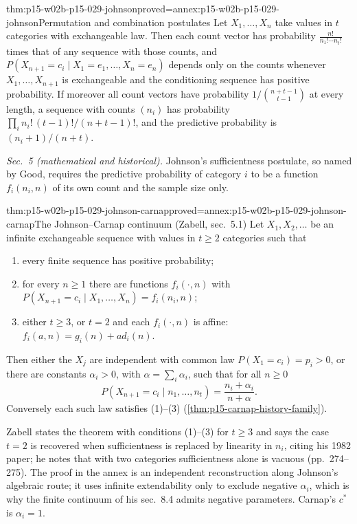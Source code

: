 \begin{hbtheorem}{thm:p15-w02b-p15-029-johnson}{proved=annex:p15-w02b-p15-029-johnson}{Permutation and combination postulates}
Let \(X_1,\ldots,X_n\) take values in \(t\) categories with
exchangeable law. Then each count vector has probability
\(\frac{n!}{n_1!\cdots n_t!}\) times that of any sequence with those
counts, and \(P(X_{n+1}=c_i\mid X_1=e_1,\ldots,X_n=e_n)\) depends
only on the counts whenever \(X_1,\ldots,X_{n+1}\) is exchangeable and
the conditioning sequence has positive probability. If moreover all count
vectors have probability \(1/\binom{n+t-1}{t-1}\) at every length, a
sequence with counts \((n_i)\) has probability
\(\prod_in_i!\,(t-1)!/(n+t-1)!\), and the predictive probability is
\((n_i+1)/(n+t)\).
\end{hbtheorem}

\emph{Sec.~5 (mathematical and historical).} Johnson's sufficientness
postulate, so named by Good, requires the predictive probability of
category \(i\) to be a function \(f_i(n_i,n)\) of its own count and
the sample size only.

\begin{hbtheorem}{thm:p15-w02b-p15-029-johnson-carnap}{proved=annex:p15-w02b-p15-029-johnson-carnap}{The Johnson--Carnap continuum (Zabell, sec.~5.1)}
Let \(X_1,X_2,\ldots\) be an infinite exchangeable sequence with values
in \(t\geq2\) categories such that
\begin{enumerate}
 \item every finite sequence has positive probability;
 \item for every \(n\geq1\) there are functions \(f_i(\cdot,n)\) with
       \(P(X_{n+1}=c_i\mid X_1,\ldots,X_n)=f_i(n_i,n)\);
 \item either \(t\geq3\), or \(t=2\) and each \(f_i(\cdot,n)\) is
       affine: \(f_i(a,n)=g_i(n)+ad_i(n)\).
\end{enumerate}
Then either the \(X_j\) are independent with common law
\(P(X_1=c_i)=p_i>0\), or there are constants \(\alpha_i>0\), with
\(\alpha=\sum_i\alpha_i\), such that for all \(n\geq0\)
\[
 P(X_{n+1}=c_i\mid n_1,\ldots,n_t)=\frac{n_i+\alpha_i}{n+\alpha}.
\]
Conversely each such law satisfies (1)--(3)
(\cref{thm:p15-carnap-history-family}).
\end{hbtheorem}

Zabell states the theorem with conditions (1)--(3) for \(t\geq3\) and
says the case \(t=2\) is recovered when sufficientness is replaced by
linearity in \(n_i\), citing his 1982 paper; he notes that with two
categories sufficientness alone is vacuous (pp.~274--275). The proof
in the annex is an independent reconstruction along Johnson's
algebraic route; it uses infinite extendability only to exclude
negative \(\alpha_i\), which is why the finite continuum of his
sec.~8.4 admits negative parameters. Carnap's \(c^*\) is
\(\alpha_i=1\).

